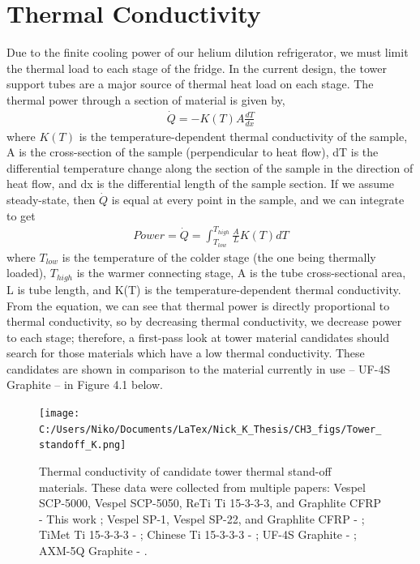\documentclass{report}
\begin{document}
\section{Thermal Conductivity}
Due to the finite cooling power of our helium dilution refrigerator, we must limit the
thermal load to each stage of the fridge. In the current design, the tower support tubes are a major source of thermal heat load on each stage. The thermal power through a section of material is given by,
\begin{eqnarray}
\dot{Q} = -K(T) A \frac{dT}{dx}
\end{eqnarray}
where $K(T)$ is the temperature-dependent thermal conductivity of the sample, A is the cross-section of the sample (perpendicular to heat flow), dT is the differential temperature change along the section of the sample in the direction of heat flow, and dx is the differential length of the sample section. If we assume steady-state, then $\dot{Q}$ is equal at every point in the sample, and we can integrate to get
\begin{eqnarray}
Power = \dot{Q} = \int_{T_{low}}^{T_{high}} \frac{A}{L}K(T)dT
\end{eqnarray}
where $T_{low}$ is the temperature of the colder stage (the one being thermally loaded), $T_{high}$ is the warmer
connecting stage, A is the tube cross-sectional area, L is tube length, and K(T) is the temperature-dependent
thermal conductivity. From the equation, we can see that thermal power is directly proportional
to thermal conductivity, so by decreasing thermal conductivity, we decrease power to each
stage; therefore, a first-pass look at tower material candidates should search for those materials which have a low thermal conductivity. These candidates are shown in comparison to the material currently in use -- UF-4S Graphite -- in Figure 4.1 below.

\begin{figure}[ht]
\texttt{[image: C:/Users/Niko/Documents/LaTex/Nick\_K\_Thesis/CH3\_figs/Tower\_standoff\_K.png]}
\caption{Thermal conductivity of candidate tower thermal stand-off materials. These data were collected from multiple papers: Vespel SCP-5000, Vespel SCP-5050, ReTi Ti 15-3-3-3, and Graphlite CFRP - This work ; Vespel SP-1, Vespel SP-22, and Graphlite CFRP - \cite{run} ; TiMet Ti 15-3-3-3 - \cite{wik} ; Chinese Ti 15-3-3-3 - \cite{Run_ti153} ;  UF-4S Graphite - \cite{lem} ; AXM-5Q Graphite - \cite{woo:gr}.}
\end{figure}
\end{document}
